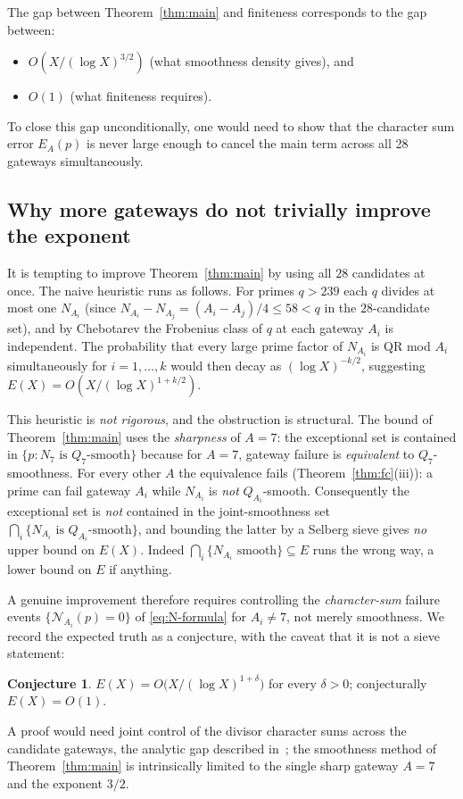 \documentclass[12pt]{amsart}
\theoremstyle{definition}
\newtheorem{conjecture}[theorem]{Conjecture}
\theoremstyle{remark}
\begin{document}
The gap between Theorem~\ref{thm:main} and finiteness corresponds to
the gap between:
\begin{itemize}
  \item $O(X/(\log X)^{3/2})$ (what smoothness density gives), and
  \item $O(1)$ (what finiteness requires).
\end{itemize}
To close this gap unconditionally, one would need to show that
the character sum error $E_A(p)$ is never large enough to cancel
the main term across all 28 gateways simultaneously.

\subsection{Why more gateways do not trivially improve the exponent}

It is tempting to improve Theorem~\ref{thm:main} by using all $28$
candidates at once. The naive heuristic runs as follows. For primes
$q > 239$ each $q$ divides at most one $N_{A_i}$ (since
$N_{A_i} - N_{A_j} = (A_i - A_j)/4 \le 58 < q$ in the $28$-candidate set),
and by Chebotarev the Frobenius class of $q$ at each gateway $A_i$ is
independent. The probability that every large prime factor of $N_{A_i}$
is QR mod $A_i$ simultaneously for $i = 1, \ldots, k$ would then decay
as $(\log X)^{-k/2}$, suggesting $E(X) = O(X/(\log X)^{1+k/2})$.

This heuristic is \emph{not rigorous}, and the obstruction is structural.
The bound of Theorem~\ref{thm:main} uses the \emph{sharpness} of $A = 7$:
the exceptional set is contained in $\{p : N_7 \text{ is } Q_7\text{-smooth}\}$
because for $A = 7$, gateway failure is \emph{equivalent} to
$Q_7$-smoothness. For every other $A$ the equivalence fails
(Theorem~\ref{thm:fc}(iii)): a prime can fail gateway $A_i$ while
$N_{A_i}$ is \emph{not} $Q_{A_i}$-smooth. Consequently the exceptional
set is \emph{not} contained in the joint-smoothness set
$\bigcap_i \{N_{A_i}\text{ is }Q_{A_i}\text{-smooth}\}$, and bounding the
latter by a Selberg sieve gives \emph{no} upper bound on $E(X)$. Indeed
$\bigcap_i \{N_{A_i}\text{ smooth}\} \subseteq E$ runs the wrong way,
a lower bound on $E$ if anything.

A genuine improvement therefore requires controlling the
\emph{character-sum} failure events $\{\mathcal{N}_{A_i}(p) = 0\}$ of
\eqref{eq:N-formula} for $A_i \ne 7$, not merely smoothness. We record
the expected truth as a conjecture, with the caveat that it is not a
sieve statement:
\begin{conjecture}\label{conj:stronger}
$E(X) = O\bigl(X/(\log X)^{1+\delta}\bigr)$ for every $\delta > 0$;
conjecturally $E(X) = O(1)$.
\end{conjecture}
A proof would need joint control of the divisor character sums across the
candidate gateways, the analytic gap described in~\cite{closure-paper};
the smoothness method of Theorem~\ref{thm:main} is intrinsically limited
to the single sharp gateway $A = 7$ and the exponent $3/2$.
\end{document}
